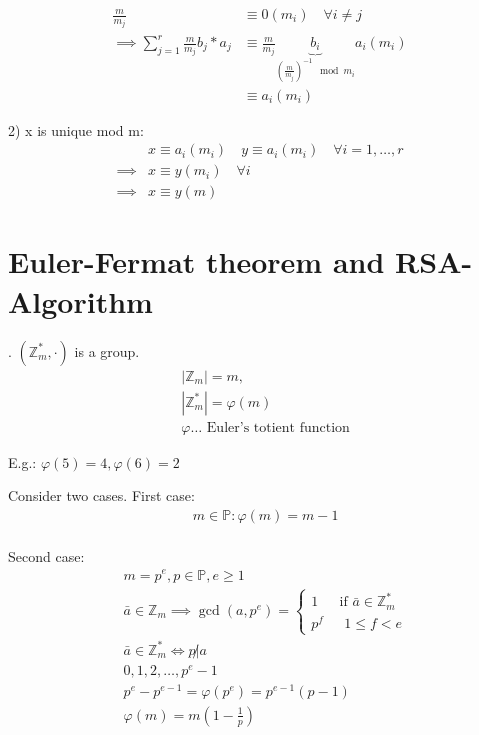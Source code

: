 \begin{align*}
  \frac{m}{m_j} &\equiv 0 (m_i) \quad \forall i \neq j \\
  \implies \sum_{j=1}^{r}\frac{m}{m_j} b_j * a_j &\equiv 
    \frac{m}{m_j} \underbrace{b_i}_{(\frac{m}{m_j})^{-1} \mod m_i} a_i (m_i) \\
  &\equiv a_i (m_i)
\end{align*}

2) x is unique mod m:
\begin{align*}
  & x \equiv a_i(m_i) \quad y \equiv a_i (m_i) \quad \forall i = 1,\ldots, r \\
  \implies & x \equiv y (m_i) \quad \forall i \\
  \implies & x \equiv y (m)
\end{align*}

\section{Euler-Fermat theorem and RSA-Algorithm}

\Theorem.
$(\mathbb{Z}_m^{*}, \cdot)$ is a group.
\begin{align*}
  &|\mathbb{Z}_m| = m, \\
  &|\mathbb{Z}_m^{*}| = \varphi(m) \\
  &\varphi \ldots \text{ Euler's totient function}
\end{align*}

E.g.: $\varphi(5) = 4, \varphi(6) = 2$

Consider two cases. First case:
\begin{align*}
  &m \in \mathbb{P}: \varphi(m) = m-1 \\
\end{align*}

Second case:
\begin{align*}
  &m = p^e, p \in \mathbb{P}, e \geq 1 \\
  &\bar{a}\in \mathbb{Z}_m \implies \gcd(a,p^e) = \begin{cases}
    1   &\text{ if $\bar{a} \in \mathbb{Z}_m^{*}$} \\
    p^f &\text{ $1 \leq f < e$} 
  \end{cases} \\
  &\bar{a}\in \mathbb{Z}_m^{*} \Leftrightarrow p \not|a \\
  & 0,1,2, \ldots, p^e -1\\
  & p^e - p^{e-1} = \varphi(p^e) = p^{e-1}(p-1) \\
  & \varphi(m) = m\left(1-\frac{1}{p}\right) 
\end{align*}

